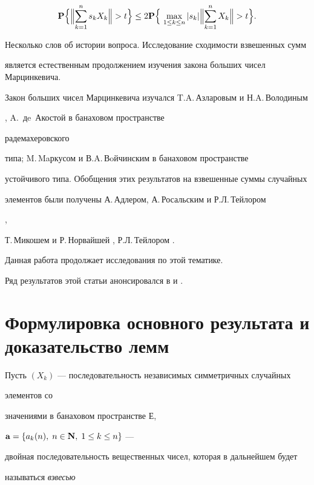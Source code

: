 $$


\bold P\Bigl\{\Bigl\|\sum^n_{k=1}s_kX_k\Bigr\|>t\Bigr\}\le


2\bold P\Bigr\{\,\max_{1\le k\le n}|s_k|\Bigl\|\sum^n_{k=1}X_k\Bigr\|>t\Bigr\}.


$$ 


\medskip





Несколько слов об истории вопроса. Исследование сходимости взвешенных сумм


является естественным продолжением изучения закона больших чисел Марцинкевича.


Закон больших чисел Марцинкевича изучался T.A.\,Азларовым и Н.A.\,Володиным


\cite{Azl}, A.~дe~Акостой \cite{Aco} в банаховом пространстве 


радемахеровского


типа; M.\,Maркусом и В.A.\,Вoйчинским \cite{Marc} в банаховом пространстве


устойчивого типа. Обобщения этих результатов на взвешенные суммы случайных


элементов были получены А.\,Адлером, А.\,Росальским и Р.Л.\,Тейлором


\cite{Adl},


Т.\,Микошем и Р.\,Норвайшей \cite{Mik}, Р.Л.\,Тейлором \cite{Tay}.


Данная работа продолжает исследования по этой тематике.


Ряд результатов этой статьи анонсировался в \cite{Vol1} и \cite{Vol2}.





\section{Формулировка основного результата и доказательство лемм}





Пусть $(X_{k})$ --- последовательность независимых симметричных случайных 


элементов со


значениями в банаховом пространстве $Е$,


${\bold a}=\{a_{k} (n),\;n\in \bold N,\;1\le k\le n\}$ ---


двойная последовательность вещественных чисел, которая в дальнейшем будет


называться {\it взвесью}


